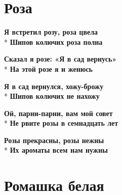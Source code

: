 \vspace{\fill}\newpage

\section{Роза}
\label{song:Роза}

\medskip

\begin{minipage}{\linewidth}
\textbf{Я встретил розу, роза цвела}\\*
\textbf{Шипов колючих роза полна}\\
\end{minipage}\par\medskip\nobreak

\medskip

\begin{minipage}{\linewidth}
\textbf{Сказал я розе: «Я в сад вернусь»}\\*
\textbf{На этой розе я и женюсь}\\
\end{minipage}\par\medskip\nobreak

\medskip

\begin{minipage}{\linewidth}
\textbf{Я в сад вернулся, хожу-брожу}\\*
\textbf{Шипов колючих не нахожу}\\
\end{minipage}\par\medskip\nobreak

\medskip

\begin{minipage}{\linewidth}
\textbf{Ой, парни-парни, вам мой совет}\\*
\textbf{Не рвите розы в семнадцать лет}\\
\end{minipage}\par\medskip\nobreak

\medskip

\begin{minipage}{\linewidth}
\textbf{Розы прекрасны, розы нежны}\\*
\textbf{Их ароматы всем нам нужны}\\
\end{minipage}

\vspace{\fill}\newpage

\section{Ромашка белая}
\label{song:Ромашка_белая}

